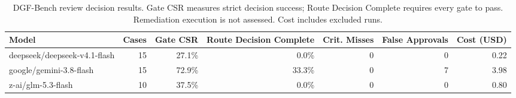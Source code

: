 \begin{table}[t]
\centering
\caption{DGF-Bench review decision results. Gate CSR measures strict decision success; Route Decision Complete requires every gate to pass. Remediation execution is not assessed. Cost includes excluded runs.}
\label{tab:dgfbench-main-results}
\begin{tabular}{lrrrrrr}
\toprule
Model & Cases & Gate CSR & Route Decision Complete & Crit. Misses & False Approvals & Cost (USD) \\
\midrule
deepseek/deepseek-v4.1-flash & 15 & 27.1\% & 0.0\% & 0 & 0 & 0.22 \\
google/gemini-3.8-flash & 15 & 72.9\% & 33.3\% & 0 & 7 & 3.98 \\
z-ai/glm-5.3-flash & 10 & 37.5\% & 0.0\% & 0 & 0 & 0.80 \\
\bottomrule
\end{tabular}
\end{table}
